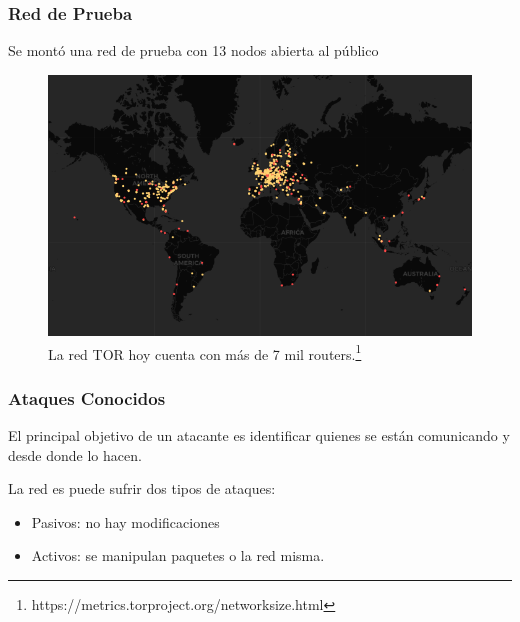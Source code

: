 \documentclass{beamer}
\newcommand{\vspc}{\vspace{0.5cm}}
\begin{document}
\begin{frame}
    \frametitle{Red de Prueba}

    Se montó una red de prueba con 13 nodos abierta al público

    \vspc

    \begin{figure}[h]
        \centering
        \includegraphics[scale=0.3]{tpo_tor.png}
        \caption{La red TOR hoy cuenta con más de 7 mil routers.\footnote{https://metrics.torproject.org/networksize.html}}
    \end{figure}

\end{frame}

\begin{frame}
    \frametitle{Ataques Conocidos}
    
    El principal objetivo de un atacante es identificar quienes se están comunicando y desde donde lo hacen.\\

    \vspc

    La red es puede sufrir dos tipos de ataques:
    \begin{itemize}
        \item Pasivos: no hay modificaciones
        \item Activos: se manipulan paquetes o la red misma.
    \end{itemize}

\end{frame}
\end{document}
